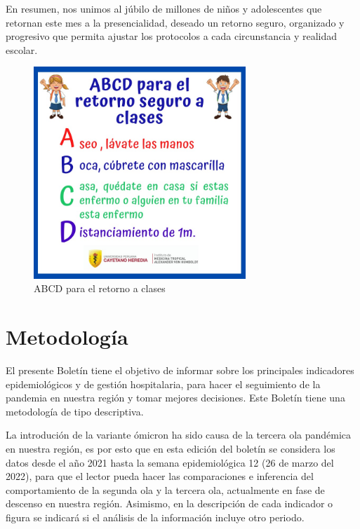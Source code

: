 \documentclass[12pt,a4paper,openany]{book}
\begin{document}
En resumen, nos unimos al  júbilo de millones de niños y adolescentes que retornan este mes a la presencialidad, deseado un retorno  seguro,  organizado y progresivo que permita ajustar los protocolos a cada circunstancia y realidad escolar.  
\begin{figure}[htb]
	\centering
	\includegraphics[width=8cm]{../editorial/editorial_abc}
	\caption*{ ABCD para el retorno a clases}
\end{figure}


	
	
	\clearpage
	
	\section*{Metodología}	
	\noindent El presente Boletín tiene el objetivo de informar sobre los principales indicadores epidemiológicos y de gestión hospitalaria,  para hacer el seguimiento de la pandemia en nuestra región y tomar mejores decisiones. Este Boletín tiene una metodología de tipo descriptiva. 
	
	La introdución de la variante ómicron ha sido causa de la tercera ola pandémica en nuestra región, es por esto que en esta edición del boletín se considera los datos desde el año 2021 hasta la semana epidemiológica 12 (26 de marzo del 2022), para que el lector pueda hacer las comparaciones e inferencia del comportamiento de la segunda ola y la tercera ola, actualmente en fase de descenso en nuestra región. Asimismo, en la descripción de cada indicador o figura se indicará si el análisis de la información incluye otro periodo. 
	
\end{document}
